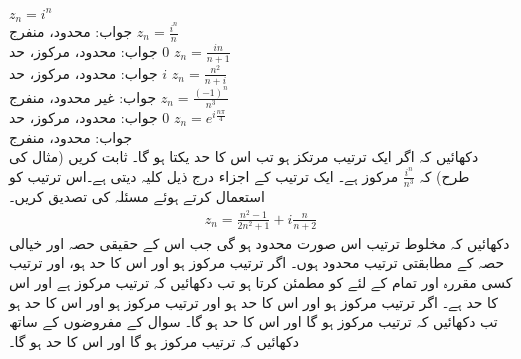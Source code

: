 \quad
$z_n=i^n$\\
جواب:\quad
محدود، منفرج
\quad
$z_n=\tfrac{i^n}{n}$\\
جواب:\quad
محدود، مرکوز، حد $0$
\quad
$z_n=\tfrac{in}{n+1}$\\
جواب:\quad
محدود، مرکوز، حد $i$
\quad
$z_n=\tfrac{n^2}{n+i}$\\
جواب:\quad
غیر محدود، منفرج
\quad
$z_n=\tfrac{(-1)^n}{n^3}$\\
جواب:\quad
محدود، مرکوز، حد $0$
\quad
$z_n=e^{i\tfrac{n\pi}{4}}$\\
جواب:\quad
محدود، منفرج
\quad {}\\
دکھائیں کہ اگر ایک ترتیب مرتکز ہو تب اس کا حد یکتا ہو گا۔
\quad
ثابت کریں (مثال  کی طرح) کہ 
$\tfrac{i^n}{n^3}$
مرکوز ہے۔
\quad
ایک ترتیب کے اجزاء درج ذیل کلیہ دیتی ہے۔اس ترتیب کو استعمال کرتے ہوئے مسئلہ  کی تصدیق کریں۔\\
\begin{align*}
z_n=\frac{n^2-1}{2n^2+1}+i\frac{n}{n+2}
\end{align*}
\quad
دکھائیں کہ مخلوط ترتیب  اس صورت محدود ہو گی جب اس کے حقیقی حصہ اور خیالی حصہ کے مطابقتی ترتیب محدود ہوں۔
\quad
اگر ترتیب  مرکوز ہو اور اس کا حد  ہو، اور ترتیب  کسی مقررہ  اور تمام  کے  لئے   کو مطمئن کرتا ہو تب دکھائیں کہ ترتیب  مرکوز ہے اور اس کا حد  ہے۔
\quad
اگر ترتیب  مرکوز ہو اور اس کا حد  ہو اور ترتیب  مرکوز ہو اور اس کا حد   ہو تب دکھائیں کہ ترتیب  مرکوز ہو گا اور اس کا حد  ہو گا۔
\quad
سوال  کے مفروضوں کے ساتھ دکھائیں کہ ترتیب   مرکوز ہو گا اور اس کا حد  ہو گا۔

